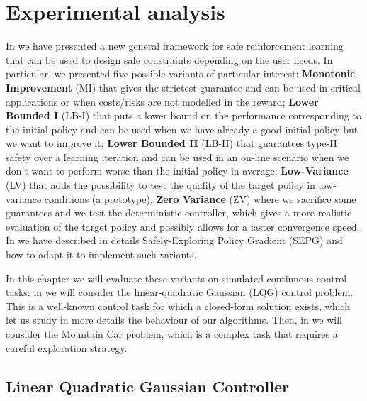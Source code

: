 \chapter{Experimental analysis}
\label{ch:experim}

\fancyhead[LE,RO]{\bfseries\thepage}                               
\fancyhead[RE]{\bfseries\leftmark}    
\fancyhead[LO]{\bfseries\rightmark}  

In  we have presented a new general framework for safe reinforcement learning that can be used to design safe constraints depending on the user needs. In particular, we presented five possible variants of particular interest: \textbf{Monotonic Improvement} (MI) that gives the strictest guarantee and can be used in critical applications or when costs/risks are not modelled in the reward; \textbf{Lower Bounded I} (LB-I) that puts a lower bound on the performance corresponding to the initial policy and can be used when we have already a good initial policy but we want to improve it; \textbf{Lower Bounded II} (LB-II) that guarantees type-II safety over a learning iteration and can be used in an on-line scenario when we don't want to perform worse than the initial policy in average; \textbf{Low-Variance} (LV) that adds the possibility to test the quality of the target policy in low-variance conditions (\eg a prototype); \textbf{Zero Variance} (ZV) where we sacrifice some guarantees and we test the deterministic controller, which gives a more realistic evaluation of the target policy and possibly allows for a faster convergence speed.\\
In  we have described in details Safely-Exploring Policy Gradient (SEPG) and how to adapt it to implement such variants.


In this chapter we will evaluate these variants on simulated continuous control tasks: in  we will consider the linear-quadratic Gaussian (LQG) control problem. This is a well-known control task for which a closed-form solution exists, which let us study in more details the behaviour of our algorithms. Then, in  we will consider the Mountain Car problem, which is a complex task that requires a careful exploration strategy. 


\section{Linear Quadratic Gaussian Controller}\label{sec:lqg}

